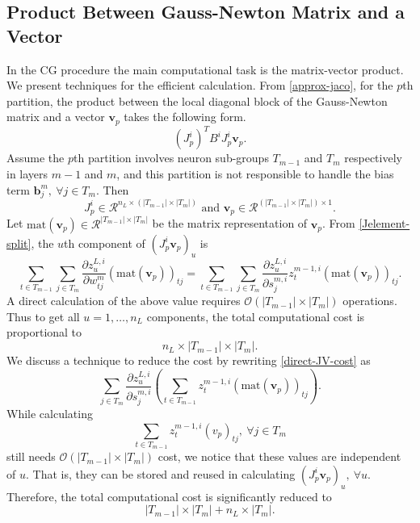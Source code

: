 \documentclass[12pt]{article}
\def\bv{{\boldsymbol v}}
\def\bb{{\boldsymbol b}}
\begin{document}
\subsection{Product Between Gauss-Newton Matrix and a Vector}
\label{subsec:Jacobian-Vector}
In the CG procedure the main computational task is the matrix-vector product. We present techniques for the efficient calculation.
From \eqref{approx-jaco}, for the $p$th partition, the product between the local diagonal block of the Gauss-Newton matrix and a vector $\bv_p$ takes the following form.
\begin{equation*}
(J_p^i)^T B^i J_p^i \bv_p.
\end{equation*} 
Assume the $p$th partition involves neuron sub-groups $T_{m-1}$ and $T_m$ respectively in layers $m-1$ and $m$, and this partition is not responsible to handle the bias term $\bb^m_j,\ \forall j \in T_m$.
Then
\begin{equation*}
J^i_p \in \mathcal R^{n_L \times (|T_{m-1}| \times |T_{m}|)} \text{ and } \bv_p \in \mathcal R^{(|T_{m-1}| \times |T_{m}|) \times 1}.
\end{equation*}
Let $\text{mat}(\bv_p) \in \mathcal R^{|T_{m-1}|\times|T_m|}$ be the matrix representation of $\bv_p$. 
From \eqref{Jelement-split}, the $u$th component of $(J^i_p\bv_p)_u$ is
\begin{equation}
\label{direct-JV-cost}
\sum_{t \in T_{m-1}} \sum_{j \in T_m} \frac{\partial z^{L,i}_u}{\partial w^{m}_{tj}} (\text{mat}(\bv_p))_{tj}
= \sum_{t \in T_{m-1}} \sum_{j \in T_m} \frac{\partial z^{L,i}_u}{\partial s^{m,i}_j} z^{m-1,i}_t (\text{mat}(\bv_p))_{tj}.
\end{equation}
A direct calculation of the above value requires $\mathcal{O}(|T_{m-1}|\times|T_m|)$ operations. 
Thus to get all $u=1,\ldots,n_L$ components, the total computational cost is proportional to
\begin{equation*}
n_{L} \times |T_{m-1}| \times |T_{m}|.
\end{equation*}
We discuss a technique to reduce the cost by rewriting \eqref{direct-JV-cost} as
\begin{equation*}
 \sum_{j \in T_m} \frac{\partial z^{L,i}_u}{\partial s^{m,i}_j}\left(\sum_{t \in T_{m-1}} z^{m-1,i}_t (\text{mat}(\bv_p))_{tj}\right).
\end{equation*}
While calculating
\begin{equation*}
\sum_{t \in T_{m-1}} z^{m-1,i}_t (v_p)_{tj},\ \forall j \in T_m
\end{equation*}
still needs $\mathcal{O}(|T_{m-1}|\times|T_m|)$ cost, we notice that these values are independent of $u$. That is, they
can be stored and reused in calculating $(J^i_p\bv_p)_u,\ \forall u$. Therefore, the total computational cost is significantly reduced to
\begin{equation}
\label{jv-comp-cost}
|T_{m-1}| \times |T_{m}| + n_L \times |T_m|.
\end{equation}
\end{document}
